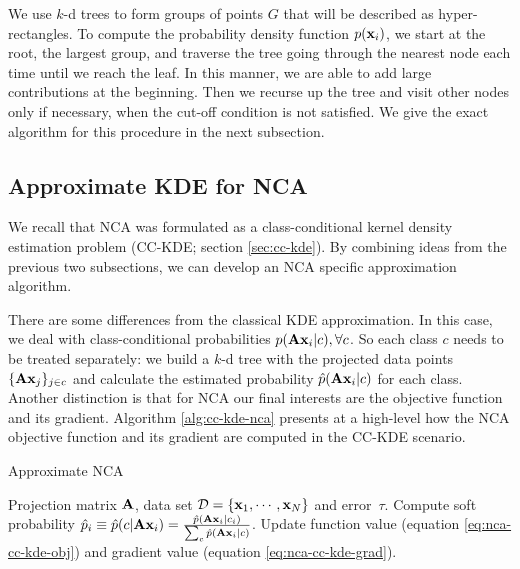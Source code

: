 We use $k$-d trees to form groups of points $G$ that will be described as hyper-rectangles. To compute the probability density function $p(\mathbf{x}_i)$, we start at the root, the largest group, and traverse the tree going through the nearest node each time until we reach the leaf. In this manner, we are able to add large contributions at the beginning. Then we recurse up the tree and visit other nodes only if necessary, when the cut-off condition is not satisfied. We give the exact algorithm for this procedure in the next subsection.

\subsection{Approximate KDE for NCA}
\label{subsec:approx-KDE-for-NCA}
 
We recall that NCA was formulated as a class-conditional kernel density estimation problem (CC-KDE; section \ref{sec:cc-kde}). By combining ideas from the previous two subsections, we can develop an NCA specific approximation algorithm.

There are some differences from the classical KDE approximation. In this case, we deal with class-conditional probabilities $p(\mathbf{A}\mathbf{x}_i|c),\forall c$. So each class $c$ needs to be treated separately: we build a $k$-d tree with the projected data points $\{\mathbf{A}\mathbf{x}_j\}_{j\in c}$ and calculate the estimated probability $\hat{p}(\mathbf{A}\mathbf{x}_i|c)$ for each class. Another distinction is that for NCA our final interests are the objective function and its gradient. Algorithm \ref{alg:cc-kde-nca} presents at a high-level how the NCA objective function and its gradient are computed in the CC-KDE scenario.

	\begin{algorithm}
		\caption{Approximate NCA} 
		\label{alg:cc-kde-nca}  
		\begin{algorithmic}[1]                    %
			\REQUIRE Projection matrix $\mathbf{A}$, data set
$\mathcal{D}=\{\mathbf{x}_1,\cdots,\mathbf{x}_N\}$ and error~$\tau$.
			\ENDFOR 
				\ENDFOR
				\STATE Compute soft probability $\hat{p}_i \equiv \hat{p}(c|\mathbf{A}\mathbf{x}_i) =
\frac{\hat{p}(\mathbf{A}\mathbf{x}_i|c_i)}{\sum_{c}\hat{p}(\mathbf{A}\mathbf{x}_i|c)}$.
				\STATE Update function value (equation \ref{eq:nca-cc-kde-obj}) and gradient value
				(equation \ref{eq:nca-cc-kde-grad}).
			\ENDFOR
		\end{algorithmic}
	\end{algorithm}

